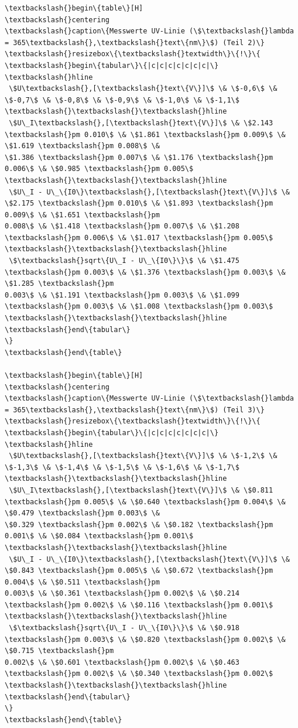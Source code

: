 \begin{Verbatim}[commandchars=\\\{\}]
\textbackslash{}begin\{table\}[H]
\textbackslash{}centering
\textbackslash{}caption\{Messwerte UV-Linie (\$\textbackslash{}lambda = 365\textbackslash{},\textbackslash{}text\{nm\}\$) (Teil 2)\}
\textbackslash{}resizebox\{\textbackslash{}textwidth\}\{!\}\{
\textbackslash{}begin\{tabular\}\{|c|c|c|c|c|c|c|\}
\textbackslash{}hline
 \$U\textbackslash{},[\textbackslash{}text\{V\}]\$ \& \$-0,6\$ \& \$-0,7\$ \& \$-0,8\$ \& \$-0,9\$ \& \$-1,0\$ \& \$-1,1\$ \textbackslash{}\textbackslash{}\textbackslash{}hline
 \$U\_I\textbackslash{},[\textbackslash{}text\{V\}]\$ \& \$2.143 \textbackslash{}pm 0.010\$ \& \$1.861 \textbackslash{}pm 0.009\$ \& \$1.619 \textbackslash{}pm 0.008\$ \&
\$1.386 \textbackslash{}pm 0.007\$ \& \$1.176 \textbackslash{}pm 0.006\$ \& \$0.985 \textbackslash{}pm 0.005\$ \textbackslash{}\textbackslash{}\textbackslash{}hline
 \$U\_I - U\_\{I0\}\textbackslash{},[\textbackslash{}text\{V\}]\$ \& \$2.175 \textbackslash{}pm 0.010\$ \& \$1.893 \textbackslash{}pm 0.009\$ \& \$1.651 \textbackslash{}pm
0.008\$ \& \$1.418 \textbackslash{}pm 0.007\$ \& \$1.208 \textbackslash{}pm 0.006\$ \& \$1.017 \textbackslash{}pm 0.005\$ \textbackslash{}\textbackslash{}\textbackslash{}hline
 \$\textbackslash{}sqrt\{U\_I - U\_\{I0\}\}\$ \& \$1.475 \textbackslash{}pm 0.003\$ \& \$1.376 \textbackslash{}pm 0.003\$ \& \$1.285 \textbackslash{}pm
0.003\$ \& \$1.191 \textbackslash{}pm 0.003\$ \& \$1.099 \textbackslash{}pm 0.003\$ \& \$1.008 \textbackslash{}pm 0.003\$ \textbackslash{}\textbackslash{}\textbackslash{}hline
\textbackslash{}end\{tabular\}
\}
\textbackslash{}end\{table\}

\textbackslash{}begin\{table\}[H]
\textbackslash{}centering
\textbackslash{}caption\{Messwerte UV-Linie (\$\textbackslash{}lambda = 365\textbackslash{},\textbackslash{}text\{nm\}\$) (Teil 3)\}
\textbackslash{}resizebox\{\textbackslash{}textwidth\}\{!\}\{
\textbackslash{}begin\{tabular\}\{|c|c|c|c|c|c|c|\}
\textbackslash{}hline
 \$U\textbackslash{},[\textbackslash{}text\{V\}]\$ \& \$-1,2\$ \& \$-1,3\$ \& \$-1,4\$ \& \$-1,5\$ \& \$-1,6\$ \& \$-1,7\$ \textbackslash{}\textbackslash{}\textbackslash{}hline
 \$U\_I\textbackslash{},[\textbackslash{}text\{V\}]\$ \& \$0.811 \textbackslash{}pm 0.005\$ \& \$0.640 \textbackslash{}pm 0.004\$ \& \$0.479 \textbackslash{}pm 0.003\$ \&
\$0.329 \textbackslash{}pm 0.002\$ \& \$0.182 \textbackslash{}pm 0.001\$ \& \$0.084 \textbackslash{}pm 0.001\$ \textbackslash{}\textbackslash{}\textbackslash{}hline
 \$U\_I - U\_\{I0\}\textbackslash{},[\textbackslash{}text\{V\}]\$ \& \$0.843 \textbackslash{}pm 0.005\$ \& \$0.672 \textbackslash{}pm 0.004\$ \& \$0.511 \textbackslash{}pm
0.003\$ \& \$0.361 \textbackslash{}pm 0.002\$ \& \$0.214 \textbackslash{}pm 0.002\$ \& \$0.116 \textbackslash{}pm 0.001\$ \textbackslash{}\textbackslash{}\textbackslash{}hline
 \$\textbackslash{}sqrt\{U\_I - U\_\{I0\}\}\$ \& \$0.918 \textbackslash{}pm 0.003\$ \& \$0.820 \textbackslash{}pm 0.002\$ \& \$0.715 \textbackslash{}pm
0.002\$ \& \$0.601 \textbackslash{}pm 0.002\$ \& \$0.463 \textbackslash{}pm 0.002\$ \& \$0.340 \textbackslash{}pm 0.002\$ \textbackslash{}\textbackslash{}\textbackslash{}hline
\textbackslash{}end\{tabular\}
\}
\textbackslash{}end\{table\}


\end{Verbatim}
